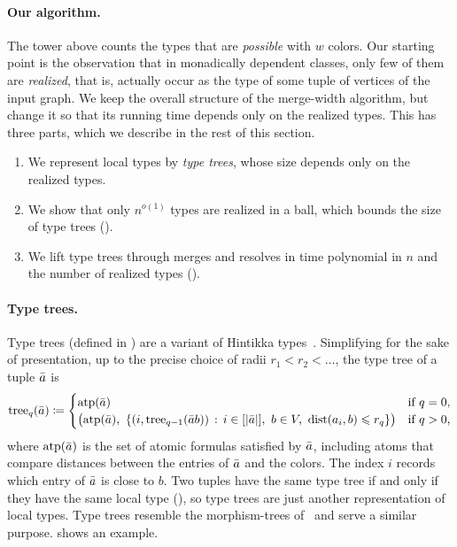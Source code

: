 \paragraph{Our algorithm.}
The tower above counts the types that are \emph{possible} with $w$ colors.
Our starting point is the observation that in monadically dependent classes, only few of them are \emph{realized}, that is, actually occur as the type of some tuple of vertices of the input graph.
We keep the overall structure of the merge-width algorithm, but change it so that its running time depends only on the realized types.
This has three parts, which we describe in the rest of this section.
\begin{enumerate}
  \item We represent local types by \emph{type trees}, whose size depends only on the realized types.
  \item We show that only $n^{o(1)}$ types are realized in a ball, which bounds the size of type trees ().
  \item We lift type trees through merges and resolves in time polynomial in $n$ and the number of realized types ().
\end{enumerate}

\paragraph{Type trees.}
Type trees (defined in ) are a variant of Hintikka types~\cite{Scott1979}.
Simplifying for the sake of presentation, up to the precise choice of radii $r_1<r_2<\ldots$, the type tree of a tuple $\bar a$ is 
\[
\tree_q(\tup a)\coloneqq
\begin{cases}
\atp(\tup a)&\text{if $q=0$,}\\
\bigl(\atp(\tup a),\ \setof{(i,\tree_{q-1}(\tup a b))}{i\in[|\tup a|],\ b\in V,\ \dist(a_i,b)\le r_q}\bigr)&\text{if $q>0$,}
\end{cases}
\]
where $\textnormal{atp}(\bar a)$ is the set of atomic formulas satisfied by $\bar a$, including atoms that compare distances between the entries of $\bar a$ and the colors.
The index $i$ records which entry of $\bar a$ is close to $b$.
Two tuples have the same type tree if and only if they have the same local type (), so type trees are just another representation of local types.
Type trees resemble the morphism-trees of~\cite{tww1} and serve a similar purpose.
 shows an example.

